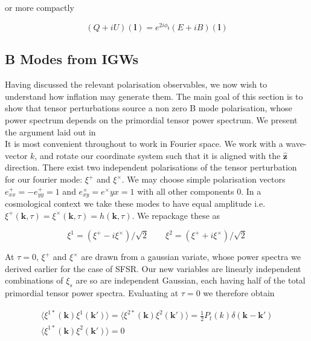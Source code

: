 \documentclass[a4paper,10pt]{article}
\renewcommand{\v}[1]{\mathbf{#1}}
\newcommand{\half}{\frac{1}{2}}
\newcommand{\unit}[1]{\hat{\v{#1}}}
\begin{document}
or more compactly

\begin{equation}
(Q+iU)(\v{l}) = e^{2i\phi_\v{l}}(E+iB)(\v{l})
\end{equation}

\subsection{B Modes from IGWs}

Having discussed the relevant polarisation observables, we now wish to understand how inflation may generate them. The main goal of this section is to show that tensor perturbations source a non zero B mode polarisation, whose power spectrum depends on the primordial tensor power spectrum. We present the argument laid out in \cite{all-sky}\\

It is most convenient throughout to work in Fourier space.  We work with a wave-vector $k$, and rotate our coordinate system such that it is aligned with the $\unit{z}$ direction. There exist two independent polarisations of the tensor perturbation for our fourier mode: $\xi^+$ and $\xi^\times$. We may choose simple polarisation vectors $e^+_{xx}=-e^+_{yy}=1$ and $e^\times_{xy}=e^\times{yx}=1$ with all other components 0. In a cosmological context we take these modes to have equal amplitude i.e. $\xi^+(\v{k},\tau)=\xi^\times(\v{k},\tau)=h(\v{k},\tau)$. We repackage these as

\begin{equation}
\xi^1 = (\xi^+ - i\xi^\times)/\sqrt{2} \qquad \xi^2 = (\xi^+ + i\xi^\times)/\sqrt{2}
\end{equation}

At $\tau=0$, $\xi^+$ and $\xi^\times$ are drawn from a gaussian variate, whose power spectra we derived earlier for the case of SFSR. Our new variables are linearly independent combinations of $\xi_s$ are so are independent Gaussian, each having half of the total primordial tensor power spectra. Evaluating at $\tau=0$ we therefore obtain

\begin{equation}
\begin{split}
\langle \xi^{1*}(\v{k})\xi^{1}(\v{k'})\rangle=\langle \xi^{2*}(\v{k})\xi^{2}(\v{k'})\rangle=\half P_t(k)\delta(\v{k}-\v{k'})\\
\langle \xi^{1*}(\v{k})\xi^{2}(\v{k'})\rangle=0
\end{split}
\label{statprops}
\end{equation}
\end{document}
